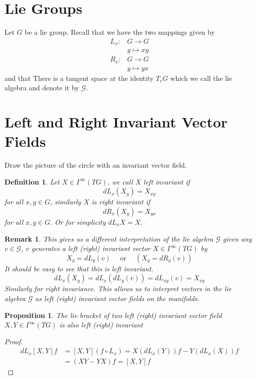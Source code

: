 \documentclass[a4paper]{article}
\newtheorem*{prop}{Proposition}
\newtheorem*{defn}{Definition}
\newtheorem*{rem}{Remark}
\begin{document}
\section*{Lie Groups}%

Let $G$ be a lie group. Recall that we have the two mappings given by 
\[
  \begin{aligned}
    L_x: &G \rightarrow G \\ 
       &y \mapsto xy \\
    R_x: &G \rightarrow G \\
         &y \mapsto yx
  \end{aligned}
\]
and that There is a tangent space at the identity $T_eG$ which we call the lie algebra and denote it by $\mathcal{G}$.

\section*{Left and Right Invariant Vector Fields}%
Draw the picture of the circle with an invariant vector field.
\begin{defn}
Let $X \in \Gamma^{\infty}(TG)$, we call $X$ left invariant if 
\[
  dL_x(X_y) = X_{xy}
\]
for all $x,y \in G$, similarly $X$ is right invariant if
\[
  dR_x(X_y) = X_{yx}
\]
for all $x,y \in G$. Or for simplicity $dL_xX = X$.
\end{defn}

\begin{rem}
  This gives us a different interpretation of the lie algebra $\mathcal{G}$ given any $v \in \mathcal{G}$, $v$ generates a left (right) invariant vector $X \in \Gamma^{\infty}(TG)$ by
  \[
    X_y = dL_y(v) \quad \text{ or } \quad \left(X_y = dR_y(v) \right)
  \]
  It should be easy to see that this is left invariant.
  \[
    d L_x(X_y) = dL_x(dL_y(v)) = dL_{xy}(v) = X_{xy}
  \]
  Similarly for right invariance. This allows us to interpret vectors in the lie algebra $\mathcal{G}$ as left (right) invariant vector fields on the manifolds.
\end{rem}

\begin{prop}
  The lie bracket of two left (right) invariant vector field $X,Y \in \Gamma^{\infty}(TG)$ is also left (right) invariant
\end{prop}

\begin{proof}
  \[
    \begin{aligned}
      dL_x [X,Y]f &=  [X,Y](f \circ L_x) = X(dL_x(Y))f - Y(dL_x(X))f \\
                    &= (XY - YX)f = [X,Y]f
    \end{aligned}
  \]
\end{proof}
\end{document}
